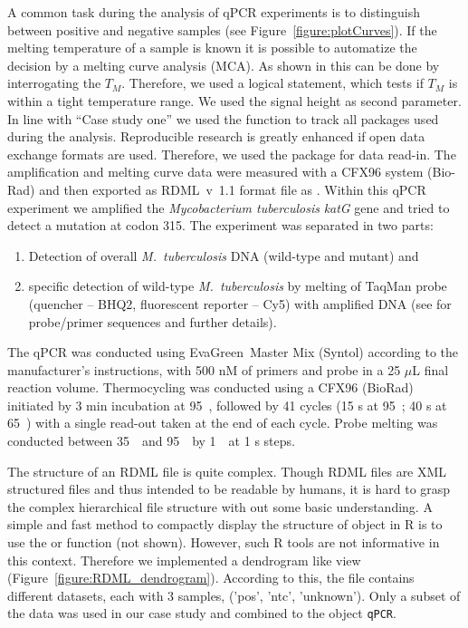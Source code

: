 A common task during the analysis of qPCR experiments is to distinguish between 
positive and negative samples (see Figure~\ref{figure:plotCurves}). If the 
melting temperature of a sample is known it is possible to automatize the 
decision by a melting curve analysis (MCA). As shown in \citet{roediger_RJ_2013} 
this can be done by interrogating the $T_{M}$. Therefore, we used a logical 
statement, which tests if $T_{M}$ is within a tight temperature range. We used 
the signal height as second parameter. In line with ``Case study one'' we used 
the function  to track all packages used during the analysis. 
Reproducible research is greatly enhanced if open data exchange formats are 
used. Therefore, we used the  package for data read-in. The 
amplification and melting curve data were measured with a CFX96 system (Bio-Rad) 
and then exported as RDML~v~1.1 format file as . 
Within this qPCR experiment we amplified the \textit{Mycobacterium tuberculosis} 
\textit{katG} gene and tried to detect a mutation at codon 315. The experiment 
was separated in two parts:

\begin{enumerate}
 \item Detection of overall \textit{M.~tuberculosis} DNA (wild-type 
and mutant) and
 \item specific detection of wild-type \textit{M.~tuberculosis} by melting of 
TaqMan probe (quencher -- BHQ2, fluorescent reporter -- Cy5) with amplified DNA 
(see \citet{luo_multiplex_2011} for probe/primer sequences and further details).
\end{enumerate}

The qPCR was conducted using EvaGreen\circledR~Master Mix (Syntol) according to 
the manufacturer's instructions, with 500 nM of primers and probe in a 25 $\mu$L 
final reaction volume. Thermocycling was conducted using a CFX96 (BioRad) 
initiated by 3 min incubation at 95~\textcelsius, followed by 41 cycles (15 s at 
95~\textcelsius; 40 s at 65~\textcelsius) with a single read-out taken at the 
end of each cycle. Probe melting was conducted between 35~\textcelsius~and 
95~\textcelsius~by 1~\textcelsius~at 1 s steps.

The structure of an RDML file is quite complex. Though RDML files are XML 
structured files and thus intended to be readable by humans, it is hard to grasp 
the complex hierarchical file structure with out some basic understanding. A 
simple and fast method to compactly display the structure of object in R is to 
use the  or  function (not shown). However, such R tools 
are not informative in this context. Therefore we implemented a dendrogram like 
view (Figure~\ref{figure:RDML_dendrogram}). According to this, the file contains 
different datasets, each with 3 samples, ('pos',  'ntc', 'unknown'). Only a 
subset of the data was used in our case study and combined to the object 
\texttt{qPCR}.

